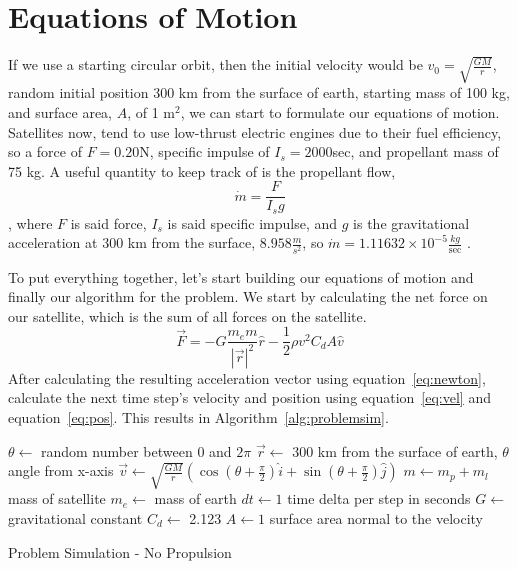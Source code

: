 \documentclass{article}
\begin{document}
\section{Equations of Motion}

If we use a starting circular orbit, then the initial velocity would be $v_0=\sqrt{\frac{GM}{r}}$, random initial position 300 km from the surface of earth, starting mass of 100 kg, and surface area, $A$, of 1 $\text{m}^2$, we can start to formulate our equations of motion. Satellites now, tend to use low-thrust electric engines due to their fuel efficiency, so a force of $F=0.20$N, specific impulse of $I_s=2000$sec, and propellant mass of 75 kg. A useful quantity to keep track of is the propellant flow, 
\begin{equation}
\dot{m}=\frac{F}{I_sg}
\end{equation}
, where $F$ is said force, $I_s$ is said specific impulse, and $g$ is the gravitational acceleration at 300 km from the surface, $8.958\frac{m}{s^2}$, so $\dot{m}=1.11632\times 10^{-5}\frac{kg}{\text{sec}}$ \cite{sutton_biblarz_2017}.

To put everything together, let's start building our equations of motion and finally our algorithm for the problem. We start by calculating the net force on our satellite, which is the sum of all forces on the satellite. 
\begin{equation}
\vec{F}=-G\frac{m_e m}{|\vec{r}|^2}\hat{r}-\frac{1}{2}\rho v^2 C_d A\hat{v}
\end{equation}
After calculating the resulting acceleration vector using equation~\ref{eq:newton}, calculate the next time step's velocity and position using equation~\ref{eq:vel} and equation~\ref{eq:pos}. This results in Algorithm~\ref{alg:problemsim}.

\begin{algorithm}
	\SetAlgoLined
	\DontPrintSemicolon
	$\theta\leftarrow$ random number between $0$ and $2\pi$\;
	$\vec{r}\leftarrow$ 300 km from the surface of earth, $\theta$ angle from x-axis\;
	$\vec{v}\leftarrow \sqrt{\frac{GM}{r}}(\cos(\theta+\frac{\pi}{2})\hat{i}+\sin(\theta+\frac{\pi}{2})\hat{j})$ \;
	$m\leftarrow m_p+m_l$ mass of satellite\;
	$m_e\leftarrow$ mass of earth \;
	$dt\leftarrow 1$ time delta per step in seconds \;
	$G\leftarrow$ gravitational constant \;
	$C_d\leftarrow$ 2.123 \;
	$A\leftarrow1$ surface area normal to the velocity\;
	\caption{Problem Simulation - No Propulsion}\label{alg:problemsim}
\end{algorithm}

\newpage



\end{document}
